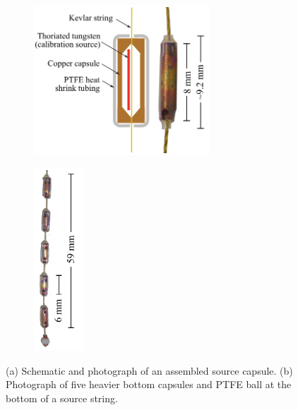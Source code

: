 \begin{figure}[htpb]
\begin{center}
\begin{subfigure}[b]{0.60\textwidth}
\includegraphics[height=2.2in]{Figures/source_capsule_schematic.pdf}
\caption{}
\label{fig:source_carrierA}
\end{subfigure}
\begin{subfigure}[b]{0.15\textwidth}
\includegraphics[height=2.7in]{Figures/string_bottom.pdf}
\caption{}
\label{fig:source_carrierB}
\end{subfigure}
\end{center}
\caption[(a) Schematic and photograph of an assembled source capsule. (b) Photograph of five heavier bottom capsules and PTFE ball at the bottom of a source string.]{(a) Schematic and photograph of an assembled source capsule. (b) Photograph of five heavier bottom capsules and PTFE ball at the bottom of a source string.}
\label{fig:source_carrier}
\end{figure}
 
